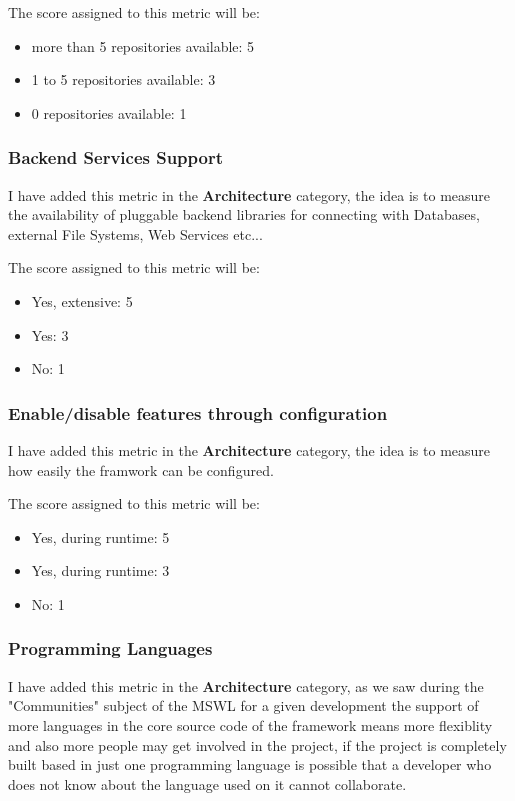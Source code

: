 \documentclass[a4paper,12pt]{book}
\begin{document}
The score assigned to this metric will be:
\begin{itemize}
 \item more than 5 repositories available: 5
 \item 1 to 5 repositories available: 3
 \item 0 repositories available: 1
\end{itemize}

\subsubsection{Backend Services Support}
\label{Backend Services Support}

I have added this metric in the \textbf{Architecture} category, the idea is to measure the availability of pluggable backend libraries for connecting with Databases, external File Systems, Web Services etc...

The score assigned to this metric will be:
\begin{itemize}
 \item Yes, extensive: 5
 \item Yes: 3
 \item No: 1
\end{itemize}

\subsubsection{Enable/disable features through configuration}
\label{Enable/disable features through configuration}

I have added this metric in the \textbf{Architecture} category, the idea is to measure how easily the framwork can be configured.

The score assigned to this metric will be:
\begin{itemize}
 \item Yes, during runtime: 5
 \item Yes, during runtime: 3
 \item No: 1
\end{itemize}

\subsubsection{Programming Languages}
\label{Programming Languages}

I have added this metric in the \textbf{Architecture} category, as we saw during the "Communities" subject of the MSWL for a given development the support of more languages in the core source code of the framework means more flexiblity and also more people may get involved in the project, if the project is completely built based in just one programming language is possible that a developer who does not know about the language used on it cannot collaborate.
\end{document}
